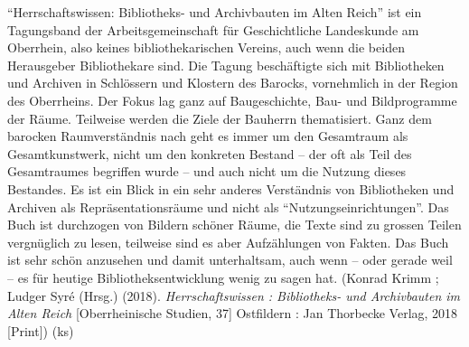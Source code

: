 \documentclass[a4paper,
fontsize=11pt,
oneside,
numbers=noperiodatend,
parskip=half-,
bibliography=totoc,
final
]{scrartcl}
\begin{document}
\enquote{Herrschaftswissen: Bibliotheks- und Archivbauten im Alten
Reich} ist ein Tagungsband der Arbeitsgemeinschaft für Geschichtliche
Landeskunde am Oberrhein, also keines bibliothekarischen Vereins, auch
wenn die beiden Herausgeber Bibliothekare sind. Die Tagung beschäftigte
sich mit Bibliotheken und Archiven in Schlössern und Klostern des
Barocks, vornehmlich in der Region des Oberrheins. Der Fokus lag ganz
auf Baugeschichte, Bau- und Bildprogramme der Räume. Teilweise werden
die Ziele der Bauherrn thematisiert. Ganz dem barocken Raumverständnis
nach geht es immer um den Gesamtraum als Gesamtkunstwerk, nicht um den
konkreten Bestand -- der oft als Teil des Gesamtraumes begriffen wurde
-- und auch nicht um die Nutzung dieses Bestandes. Es ist ein Blick in
ein sehr anderes Verständnis von Bibliotheken und Archiven als
Repräsentationsräume und nicht als \enquote{Nutzungseinrichtungen}. Das
Buch ist durchzogen von Bildern schöner Räume, die Texte sind zu grossen
Teilen vergnüglich zu lesen, teilweise sind es aber Aufzählungen von
Fakten. Das Buch ist sehr schön anzusehen und damit unterhaltsam, auch
wenn -- oder gerade weil -- es für heutige Bibliotheksentwicklung wenig
zu sagen hat. (Konrad Krimm ; Ludger Syré (Hrsg.) (2018).
\emph{Herrschaftswissen : Bibliotheks- und Archivbauten im Alten Reich}
{[}Oberrheinische Studien, 37{]} Ostfildern : Jan Thorbecke Verlag, 2018
{[}Print{]}) (ks)
\end{document}
